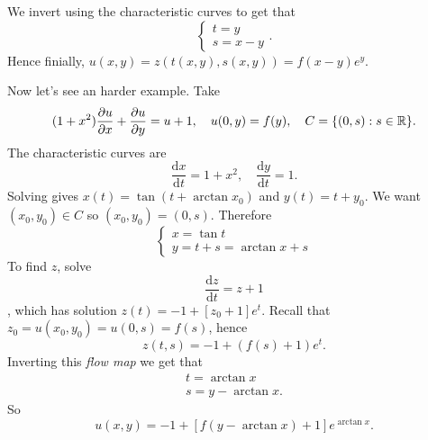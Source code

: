 \documentclass{article}
\begin{document}
We invert using the characteristic curves to get that
\[
  \begin{cases}
    t=y\\
    s=x-y
  \end{cases}.
\]
Hence finially, $ u(x,y)=z(t(x,y),s(x,y))=f(x-y)e^y $.\par
Now let's see an harder example. Take
\[
	(1+x^2)\frac{\partial u}{\partial x}+\frac{\partial u}{\partial y}=u+1,\quad u(0,y)=f(y), \quad C=\{(0,s): s\in \mathbb{R}\}.
\]
The characteristic curves are
\[
	\frac{\mathrm dx}{\mathrm dt}=1+x^2,\quad \frac{\mathrm dy}{\mathrm dt}=1.
\]
Solving gives $ x(t)=\tan(t+\arctan x_0) $ and $ y(t)=t+y_0 $. We want $ (x_0,y_0)\in C $ so $ (x_0,y_0)=(0,s) $. Therefore
\[
  \begin{cases}
    x=\tan t \\
    y=t+s=\arctan x + s
  \end{cases}
\]
To find $ z $, solve
\[
	\frac{\mathrm dz}{\mathrm dt}=z+1
\],
which has solution $ z(t)=-1+[z_0+1]e^t $. Recall that $ z_0=u(x_0,y_0)=u(0,s)=f(s) $, hence
\[
  z(t,s)=-1+(f(s)+1)e^t.
\]
Inverting this \textit{flow map} we get that
\begin{align*}
  t=\arctan x\\
  s=y-\arctan x.
\end{align*}
So 
\[
	u(x,y)=-1+[f(y-\arctan x)+1]e^{\arctan x}.
\]
\end{document}
